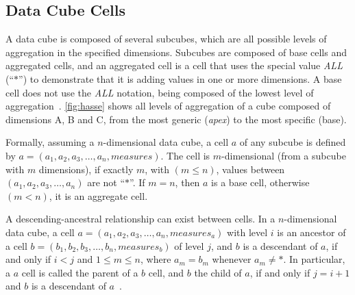 \subsection{Data Cube Cells}\label{ch:fun:cube:cells}

A data cube is composed of several subcubes, which are all possible levels of aggregation in the specified dimensions.
Subcubes are composed of base cells and aggregated cells, and an aggregated cell is a cell that uses the special value \textit{ALL} (``$*$'') to demonstrate that it is adding values in one or more dimensions.
A base cell does not use the \textit{ALL} notation, being composed of the lowest level of aggregation~\cite{limaSEQUENTIALPARALLELAPPROACHES2009}.
\autoref{fig:hasse} shows all levels of aggregation of a cube composed of dimensions A, B and C, from the most generic (\textit{apex}) to the most specific (base).

\begin{figure}[!htb]
  \caption{}\label{fig:hasse}
  \vspace{2mm}
  \begin{center}
  \end{center}
  \vspace{1mm}
\end{figure}

Formally, assuming a $n$-dimensional data cube, a cell $a$ of any subcube is defined by $a = (a_1, a_2, a_3, \ldots, a_n, measures)$.
The cell is $m$-dimensional (from a subcube with $m$ dimensions), if exactly $m$, with $(m \leq n)$, values between $(a_1, a_2, a_3, \ldots, a_n)$ are not ``$*$''.
If $m = n$, then $a$ is a base cell, otherwise $(m < n)$, it is an aggregate cell.

A descending-ancestral relationship can exist between cells.
In a $n$-dimensional data cube, a cell $a = (a_1, a_2, a_3, \ldots, a_n, measures_a)$ with level $i$ is an ancestor of a cell $b = (b_1, b_2, b_3, \ldots, b_n, measures_b)$ of level $j$, and $b$ is a descendant of $a$, if and only if $i < j$ and $1 \leq m \leq n$, where $a_m = b_m$ whenever $a_m \neq *$.
In particular, a $a$ cell is called the parent of a $b$ cell, and $b$ the child of $a$, if and only if $j = i+1$ and $b$ is a descendant of $a$~\cite{hanDataMiningConcepts2011}.


